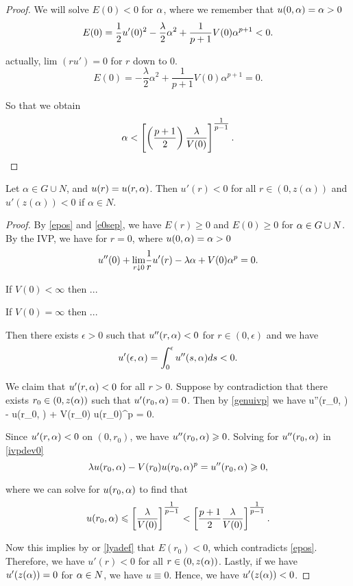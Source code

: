 \begin{proof}
We will solve $E(0) < 0$ for $\alpha$, where we remember that $u(0, \alpha) = \alpha > 0$
\[ 
    E(0) = \frac{1}{2} u'(0)^2 - \frac{\lambda}{2} \alpha^2
    + \frac{1}{p+1} V(0) \alpha^{p+1} < 0. 
\]

{\red actually, lim $(ru') = 0$ for $r$ down to $0$. 
\[ 
    E(0) = -\frac{\lambda}{2}\alpha^2 + 
    \frac{1}{p+1} V(0)\alpha^{p+1} = 0. 
\]}

So that we obtain 
\[
\alpha < \left[\left( \frac{p+1}{2}\right) \frac{\lambda}{V(0)}
\right]^{\tfrac{1}{p-1}} .
\]


\end{proof}

\begin{lemma}\label{genlem2}
Let $\alpha \in G \cup N$, and $u(r) = u(r, \alpha)$. Then $u'(r) < 0$ for all
$r \in (0, z(\alpha))$ and $u'(z(\alpha)) < 0$ if $\alpha \in N$.
\end{lemma}
\begin{proof}
By \eqref{epos} and \eqref{e0sep}, we have $E(r) \geq 0$ and $E(0) \geq 
0$ for $\alpha \in G \cup N$. By the IVP, we have for $r=0$, where $u(0, \alpha) = \alpha >
0$
\[ u''(0) + \underset{r \downarrow 0}{\lim} \frac{1}{r} u'(r) -
\lambda \alpha + V(0) \alpha^p = 0. \]

{\red If $V(0) < \infty$ then ...

If $V(0) = \infty$ then ...}

Then there exists $\epsilon > 0$ such that $u''(r, \alpha) < 0$ for $r \in (0,
\epsilon)$ and we have
\[ u'(\epsilon, \alpha) = \int_0^\epsilon u''(s, \alpha) ds < 0. \]

We claim that $u'(r, \alpha) < 0$ for all $r > 0$. Suppose by contradiction that
there exists $r_0 \in (0,z(\alpha))$ such that $u'(r_0, \alpha)=0$. Then by
\eqref{genuivp} we have 
\be \label{ivpdev0} 
u''(r_0, \a) - \lambda u(r_0, \a) + V(r_0) u(r_0)^p = 0. 
\ee

Since $u'(r, \alpha) < 0$ on $(0, r_0)$, we have $u''(r_0, \alpha) \geqslant 0$. 
Solving for $u''(r_0, \alpha)$ in \eqref{ivpdev0} 
\[ \lambda u(r_0,\alpha) - V(r_0) u(r_0,\alpha)^p = u''(r_0, \alpha) \geqslant 0, \]

where we can solve for $u(r_0, \alpha)$ to find that
\[ u(r_0, \alpha) \leqslant \left[ \frac{\lambda}{V(0)} \right]^{\tfrac{1}{p-1}} <
\left[ \frac{p+1}{2} \frac{\lambda}{V(0)} \right]^{\tfrac{1}{p-1}}. \]

Now this implies by or \eqref{lyadef} 
that $E(r_0) <
0$, which contradicts \eqref{epos}. Therefore, we have $u'(r) < 0$ for all $r
\in (0, z(\alpha))$. 
Lastly, if we have $u'(z(\alpha)) = 0$ for $\alpha \in N$, we have $u
\equiv 0$. Hence, we have $u'(z(\alpha)) < 0$.
\end{proof}

